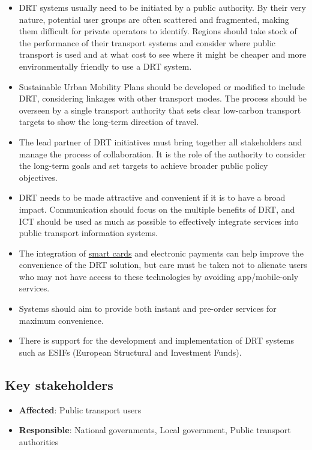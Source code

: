 \documentclass[
]{book}
\providecommand{\tightlist}{%
  \setlength{\itemsep}{0pt}\setlength{\parskip}{0pt}}
\begin{document}
\begin{itemize}
\tightlist
\item
  DRT systems usually need to be initiated by a public authority. By their very nature, potential user groups are often scattered and fragmented, making them difficult for private operators to identify. Regions should take stock of the performance of their transport systems and consider where public transport is used and at what cost to see where it might be cheaper and more environmentally friendly to use a DRT system.
\item
  Sustainable Urban Mobility Plans should be developed or modified to include DRT, considering linkages with other transport modes. The process should be overseen by a single transport authority that sets clear low-carbon transport targets to show the long-term direction of travel.
\item
  The lead partner of DRT initiatives must bring together all stakeholders and manage the process of collaboration. It is the role of the authority to consider the long-term goals and set targets to achieve broader public policy objectives.
\item
  DRT needs to be made attractive and convenient if it is to have a broad impact. Communication should focus on the multiple benefits of DRT, and ICT should be used as much as possible to effectively integrate services into public transport information systems.
\item
  The integration of \protect\hyperlink{contactless_cards}{smart cards} and electronic payments can help improve the convenience of the DRT solution, but care must be taken not to alienate users who may not have access to these technologies by avoiding app/mobile-only services.
\item
  Systems should aim to provide both instant and pre-order services for maximum convenience.
\item
  There is support for the development and implementation of DRT systems such as ESIFs (European Structural and Investment Funds).
\end{itemize}

\hypertarget{key-stakeholders-36}{%
\subsection*{Key stakeholders}\label{key-stakeholders-36}}

\begin{itemize}
\tightlist
\item
  \textbf{Affected}: Public transport users
\item
  \textbf{Responsible}: National governments, Local government, Public transport authorities
\end{itemize}
\end{document}

